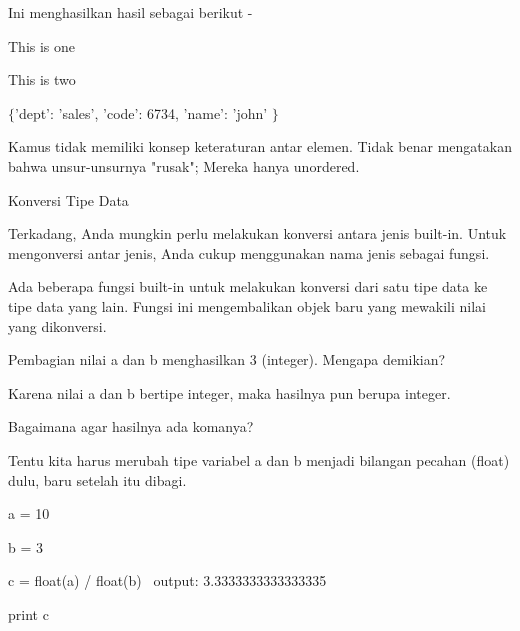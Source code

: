 \noindent 
Ini menghasilkan hasil sebagai berikut - \par
\noindent 
This is one \par
\noindent 
This is two \par
\noindent 
 $  \{  $'dept': 'sales', 'code': 6734, 'name': 'john' $  \}  $ \par
{} \par
{} \par
\vspace{12pt}
\noindent 
Kamus tidak memiliki konsep keteraturan antar elemen. $  $Tidak benar mengatakan bahwa unsur-unsurnya "rusak"; $  $Mereka hanya unordered. \par
\vspace{12pt}
\noindent 
Konversi Tipe Data \par
\vspace{12pt}
\noindent 
Terkadang, Anda mungkin perlu melakukan konversi antara jenis built-in. $  $Untuk mengonversi antar jenis, Anda cukup menggunakan nama jenis sebagai fungsi. \par
\noindent 
Ada beberapa fungsi built-in untuk melakukan konversi dari satu tipe data ke tipe data yang lain. $  $Fungsi ini mengembalikan objek baru yang mewakili nilai yang dikonversi. \par
\vspace{12pt}
\noindent 
Pembagian nilai $  $a $  $dan $  $b $  $menghasilkan $  $3 $  $(integer). Mengapa demikian? \par
\vspace{12pt}
\noindent 
Karena nilai $  $a $  $dan $  $b $  $bertipe integer, maka hasilnya pun berupa integer. \par
\vspace{12pt}
\noindent 
Bagaimana agar hasilnya ada komanya? \par
\vspace{12pt}
\noindent 
Tentu kita harus merubah tipe variabel $  $a $  $dan $  $b $  $menjadi bilangan pecahan (float) dulu, baru setelah itu dibagi. \par
\vspace{12pt}
\noindent 
a = 10 \par
\noindent 
b = 3 \par
\noindent 
c = float(a) / float(b)~ output: 3.3333333333333335 \par
\vspace{12pt}
\noindent 
print c \par
\vspace{12pt}
